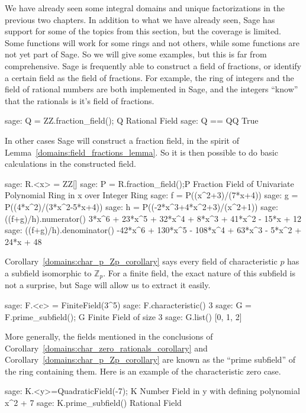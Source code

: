 We have already seen some integral domains and unique factorizations in the previous two chapters.  In addition to what we have already seen, Sage has support for some of the topics from this section, but the coverage is limited.  Some functions will work for some rings and not others, while some functions are not yet part of Sage.  So we will give some examples, but this is far from comprehensive.
%
%
Sage is frequently able to construct a field of fractions, or identify a certain field as the field of fractions.  For example, the ring of integers and the field of rational numbers are both implemented in Sage, and the integers ``know'' that the rationals is it's field of fractions.
%
\begin{sageexample}
sage: Q = ZZ.fraction_field(); Q
Rational Field
sage: Q == QQ
True
\end{sageexample}
%
In other cases Sage will construct a fraction field, in the spirit of Lemma~\ref{domains:field_fractions_lemma}.  So it is then possible to do basic calculations in the constructed field.
%
\begin{sageexample}
sage: R.<x> = ZZ[]
sage: P = R.fraction_field();P
Fraction Field of Univariate Polynomial Ring in x over Integer Ring
sage: f = P((x^2+3)/(7*x+4))
sage: g = P((4*x^2)/(3*x^2-5*x+4))
sage: h = P((-2*x^3+4*x^2+3)/(x^2+1))
sage: ((f+g)/h).numerator()
3*x^6 + 23*x^5 + 32*x^4 + 8*x^3 + 41*x^2 - 15*x + 12
sage: ((f+g)/h).denominator()
-42*x^6 + 130*x^5 - 108*x^4 + 63*x^3 - 5*x^2 + 24*x + 48
\end{sageexample}
%
%
Corollary~\ref{domains:char_p_Zp_corollary} says every field of characteristic $p$ has a subfield isomorphic to ${\mathbb Z}_p$.  For a finite field, the exact nature of this subfield is not a surprise, but Sage will allow us to extract it easily.
%
\begin{sageexample}
sage: F.<c> = FiniteField(3^5)
sage: F.characteristic()
3
sage: G = F.prime_subfield(); G
Finite Field of size 3
sage: G.list()
[0, 1, 2]
\end{sageexample}
%
More generally, the fields mentioned in the conclusions of Corollary~\ref{domains:char_zero_rationals_corollary} and Corollary~\ref{domains:char_p_Zp_corollary} are known as the ``prime subfield'' of the ring containing them.  Here is an example of the characteristic zero case.
%
\begin{sageexample}
sage: K.<y>=QuadraticField(-7); K
Number Field in y with defining polynomial x^2 + 7
sage: K.prime_subfield()
Rational Field
\end{sageexample}
